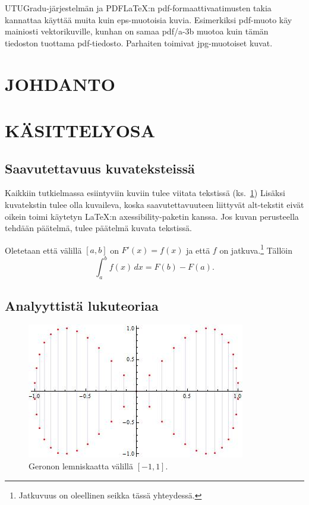 UTUGradu-järjestelmän ja PDF\LaTeX :n pdf-formaattivaatimusten takia kannattaa käyttää muita kuin eps-muotoisia kuvia. Esimerkiksi pdf-muoto käy mainiosti vektorikuville, kunhan on samaa pdf/a-3b muotoa kuin tämän tiedoston tuottama pdf-tiedosto. Parhaiten toimivat jpg-muotoiset kuvat.


\newpage\null
\pagestyle{plain} 

\section{JOHDANTO}

\lipsum[1]
\vspace{0.7cm}
\lipsum[1]


\section{KÄSITTELYOSA}
\subsection{Saavutettavuus kuvateksteissä}

Kaikkiin tutkielmassa esiintyviin kuviin tulee viitata tekstissä (ks.~\ref{kuvatus1}) Lisäksi kuvatekstin tulee olla kuvaileva, koska saavutettavuuteen liittyvät alt-tekstit eivät oikein toimi käytetyn \LaTeX :n axessibility-paketin kanssa. Jos kuvan perusteella tehdään päätelmä, tulee päätelmä kuvata tekstissä. 
\begin{theorem} Oletetaan että välillä $[a,b]$ on $F'(x)=f(x)$ ja että $f$ on jatkuva.\footnote{Jatkuvuus on oleellinen seikka tässä yhteydessä.} Tällöin
\[
\int_a^bf(x)\,dx=F(b)-F(a).
\]
\end{theorem}

\subsection{Analyyttistä lukuteoriaa}

\begin{figure}[ht]
\begin{center}
\includegraphics[width=.45\textwidth]{siivet.jpg}
\end{center}
\label{kuvatus1}
\caption{Geronon lemniskaatta välillä $[-1,1]$.}
\end{figure}

